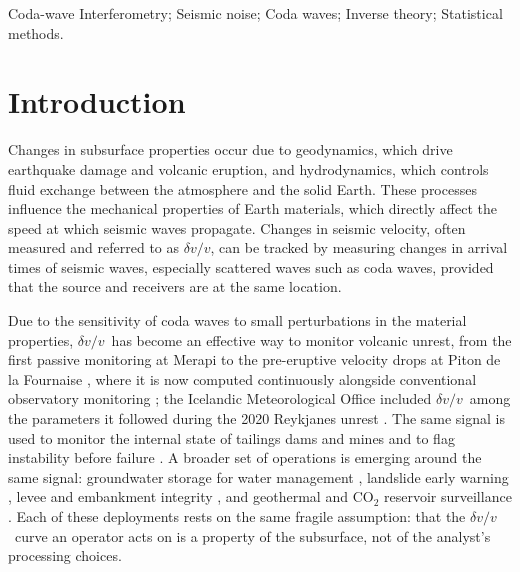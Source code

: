 \documentclass[
  referee]{gji}
\providecommand{\dvv}{\ensuremath{\delta v/v}}
\begin{document}
\begin{abstract}
evaluated, here. On three California stations the same measurement code,
run on NoisePy correlations in a cloud batch pipeline, matches the shape
of a published \dvv~product after matched 90-day smoothing
(\(r=0.83\)--\(0.99\) on 357--579 days, with a checked-in comparison
script), with amplitudes that differ by up to a factor of two at one
station; the comparison also exposed and corrected a sign-convention
error. The framework, estimators, figures with their numerical sidecars,
and the calibration experiments are released in the open Python package
\texttt{codameter}, together with a processing-choice advisor and a
seeded golden dataset with a fixed scorer; an evaluation of agents
against that dataset is left to future work.
\end{abstract}


\begin{keywords}
Coda-wave Interferometry; Seismic noise; Coda waves; Inverse theory; Statistical methods.
\end{keywords}

\section{Introduction}\label{sec:intro}

Changes in subsurface properties occur due to geodynamics, which drive
earthquake damage and volcanic eruption, and hydrodynamics, which
controls fluid exchange between the atmosphere and the solid Earth.
These processes influence the mechanical properties of Earth materials,
which directly affect the speed at which seismic waves propagate.
Changes in seismic velocity, often measured and referred to as \dvv, can
be tracked by measuring changes in arrival times of seismic waves,
especially scattered waves such as coda waves, provided that the source
and receivers are at the same location.

Due to the sensitivity of coda waves to small perturbations in the
material properties, \dvv~has become an effective way to monitor
volcanic unrest, from the first passive monitoring at Merapi
\citep{SensSchonfelder2006} to the pre-eruptive velocity drops at Piton
de la Fournaise \citep{Brenguier2008}, where it is now computed
continuously alongside conventional observatory monitoring
\citep{Duputel2009}; the Icelandic Meteorological Office included
\dvv~among the parameters it followed during the 2020 Reykjanes unrest
\citep{CubukSabuncu2021}. The same signal is used to monitor the
internal state of tailings dams and mines and to flag instability before
failure \citep{Olivier2017, Ouellet2022}. A broader set of operations is
emerging around the same signal: groundwater storage for water
management \citep{Clements2018, Mao2022}, landslide early warning
\citep{LeBreton2021}, levee and embankment integrity \citep{Planes2016},
and geothermal and CO\(_2\) reservoir surveillance \citep{Tsuji2021}.
Each of these deployments rests on the same fragile assumption: that the
\dvv~curve an operator acts on is a property of the subsurface, not of
the analyst's processing choices.
\end{document}
